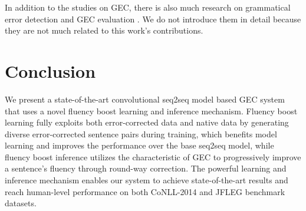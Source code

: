 \documentclass{article} %
\begin{document}


In addition to the studies on GEC, there is also much research on grammatical error detection \citep{leacock2010automated,rei-yannakoudakis:2016:P16-1,kaneko2017grammatical} and GEC evaluation \citep{tetreault2010rethinking,madnani2011they,dahlmeier2012better,napoles2015ground,sakaguchi2016reassessing,napoles2016there,bryant2017automatic,asano2017reference,choshen2018inherent}. 
We do not introduce them in detail because they are not much related to this work's contributions.

\section{Conclusion}

We present a state-of-the-art convolutional seq2seq model based GEC system that uses a novel fluency boost learning and inference mechanism. Fluency boost learning fully exploits both error-corrected data and native data by generating diverse error-corrected sentence pairs during training, which benefits model learning and improves the performance over the base seq2seq model, while fluency boost inference utilizes the characteristic of GEC to progressively improve a sentence's fluency through round-way correction. The powerful learning and inference mechanism enables our system to achieve state-of-the-art results and reach human-level performance on both CoNLL-2014 and JFLEG benchmark datasets.


\end{document}
